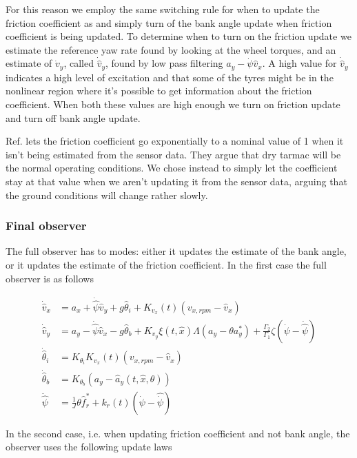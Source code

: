For this reason we employ the same switching rule for when to update the friction coefficient as \cite{MainStateEst} and simply turn of the bank angle update when friction coefficient is being updated. To determine when to turn on the friction update we estimate the reference yaw rate found by looking at the wheel torques, and an estimate of $\dot{v}_y$, called $\dot{\hat{v}}_y$, found by low pass filtering $a_y - \dot{\psi}\hat{v}_x$. A high value for $\dot{\hat{v}}_y$ indicates a high level of excitation and that some of the tyres might be in the nonlinear region where it's possible to get information about the friction coefficient. When both these values are high enough we turn on friction update and turn off bank angle update. 

Ref. \cite{MainStateEst} lets the friction coefficient go exponentially to a nominal value of 1 when it isn't being estimated from the sensor data. They argue that dry tarmac will be the normal operating conditions. We chose instead to simply let the coefficient stay at that value when we aren't updating it from the sensor data, arguing that the ground conditions will change rather slowly.

\subsubsection{Final observer}
The full observer has to modes: either it updates the estimate of the bank angle, or it updates the estimate of the friction coefficient. In the first case the full observer is as follows

\begin{align}
    \dot{\hat{v}}_x & = a_x + \dot{\hat{\psi}}\hat{v}_y + g\hat{\theta}_i + K_{v_x}(t)(v_{x,rpm} - \hat{v}_x) \\
    \dot{\hat{v}}_y & = a_y - \dot{\hat{\psi}}\hat{v}_x - g\hat{\theta}_b + K_{v_y}\xi(t,\hat{x})\Lambda(a_y - \theta a_y^{*}) + \frac{\Gamma_2}{\Gamma_1}\zeta(\dot{\psi} - \dot{\hat{\psi}}) \\ 
    \dot{\hat{\theta}}_i & = K_{\theta_i}K_{v_x}(t)(v_{x,rpm} - \hat{v}_x) \\
    \dot{\hat{\theta}}_b & = K_{\theta_b}(a_y-\hat{a}_y(t,\hat{x},\theta)) \\ 
    \ddot{\hat{\psi}} & = \frac{1}{J}\theta \hat{f}_r^* + k_r(t)(\dot{\psi}-\hat{\dot{\psi}})
\end{align}

In the second case, i.e. when updating friction coefficient and not bank angle, the observer uses the following update laws

